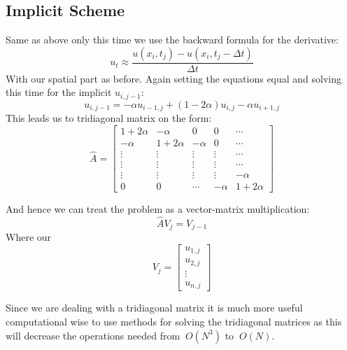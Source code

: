 \documentclass{article}
\begin{document}
\subsection{Implicit Scheme}
Same as above only this time we use the backward formula for the derivative:
$$u_t \approx \frac{u(x_i, t_j) - u(x_i, t_j -\Delta t)}{\Delta t}$$
With our spatial part as before. Again setting the equations equal and solving this time for the implicit $u_{i,j-1}$:
$$u_{i,j-1} = -\alpha u_{i-1,j} + (1 -2\alpha)u_{i,j} - \alpha u_{i+1,j}$$
This leads us to tridiagonal matrix on the form:
$$\hat{A} = \begin{bmatrix}
       1+2\alpha &  -\alpha  & 0           & 0        & \cdots  \\[0.3em]
       -\alpha   & 1+2\alpha & -\alpha 	   & 0        & \cdots  \\[0.3em]
       \vdots 	 & \vdots    & \vdots      & \vdots   & \cdots  \\[0.3em]
       \vdots    & \vdots    & \vdots      & \vdots   & \cdots  \\[0.3em]
       \vdots    & \vdots    & \vdots      & \vdots   & -\alpha \\[0.3em]
       0         & 0         & \cdots      & -\alpha  & 1+2\alpha
     \end{bmatrix} $$

And hence we can treat the problem as a vector-matrix multiplication:
$$\hat{A}V_j = V_{j-1}$$
Where our $$V_j = \begin{bmatrix}
					u_{1,j} \\
					u_{2,j} \\
					\vdots  \\
					u_{n,j} 
				\end{bmatrix}$$

Since we are dealing with a tridiagonal matrix it is much more useful computational wise to use methods for solving the tridiagonal matrices as this will decrease the operations needed from $~O(N^3)$ to $~O(N)$.
\end{document}
